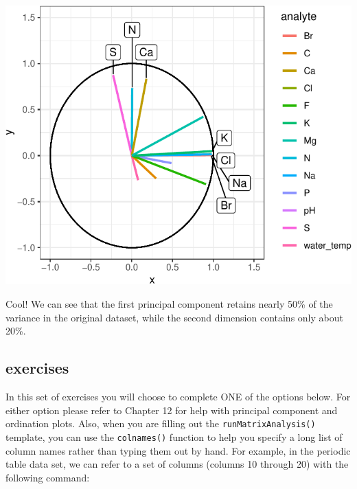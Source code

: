 \documentclass[
]{krantz}
\begin{document}
\begin{center}\includegraphics{index_files/figure-latex/unnamed-chunk-97-1} \end{center}

Cool! We can see that the first principal component retains nearly 50\% of the variance in the original dataset, while the second dimension contains only about 20\%.

\hypertarget{exercises-4}{%
\subsection{exercises}\label{exercises-4}}

In this set of exercises you will choose to complete ONE of the options below. For either option please refer to Chapter 12 for help with principal component and ordination plots. Also, when you are filling out the \texttt{runMatrixAnalysis()} template, you can use the \texttt{colnames()} function to help you specify a long list of column names rather than typing them out by hand. For example, in the periodic table data set, we can refer to a set of columns (columns 10 through 20) with the following command:
\end{document}
